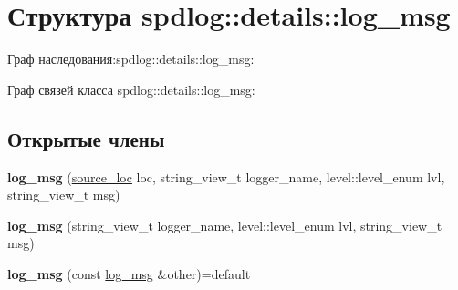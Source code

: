 \hypertarget{structspdlog_1_1details_1_1log__msg}{}\section{Структура spdlog\+:\+:details\+:\+:log\+\_\+msg}
\label{structspdlog_1_1details_1_1log__msg}


Граф наследования\+:spdlog\+:\+:details\+:\+:log\+\_\+msg\+:


Граф связей класса spdlog\+:\+:details\+:\+:log\+\_\+msg\+:
\subsection*{Открытые члены}
\begin{DoxyCompactItemize}
\item 
\mbox{\label{structspdlog_1_1details_1_1log__msg_a5df47deba227182327c25043fda4f1c9}} 
{\bfseries log\+\_\+msg} (\hyperlink{structspdlog_1_1source__loc}{source\+\_\+loc} loc, string\+\_\+view\+\_\+t logger\+\_\+name, level\+::level\+\_\+enum lvl, string\+\_\+view\+\_\+t msg)
\item 
\mbox{\label{structspdlog_1_1details_1_1log__msg_a8a0124622ba01c19f69aca14a4b1b019}} 
{\bfseries log\+\_\+msg} (string\+\_\+view\+\_\+t logger\+\_\+name, level\+::level\+\_\+enum lvl, string\+\_\+view\+\_\+t msg)
\item 
\mbox{\label{structspdlog_1_1details_1_1log__msg_ad3ff125f04a5854bf78f6c359af5183a}} 
{\bfseries log\+\_\+msg} (const \hyperlink{structspdlog_1_1details_1_1log__msg}{log\+\_\+msg} \&other)=default
\end{DoxyCompactItemize}
